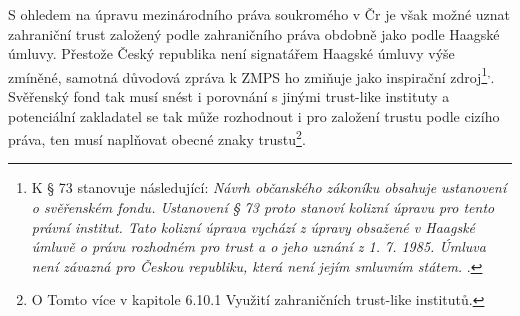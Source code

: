 \documentclass{article}
\begin{document}
S ohledem na úpravu mezinárodního práva soukromého v Čr je však možné uznat zahraniční trust založený podle zahraničního práva obdobně jako podle Haagské úmluvy. Přestože Český republika není signatářem Haagské úmluvy výše zmíněné, samotná důvodová zpráva k ZMPS ho zmiňuje jako inspirační zdroj\footnote{K § 73 stanovuje následující: \textit{Návrh občanského zákoníku obsahuje ustanovení o svěřenském fondu. Ustanovení § 73 proto stanoví kolizní úpravu pro tento právní institut. Tato kolizní úprava vychází z úpravy obsažené v Haagské úmluvě o právu rozhodném pro trust a o jeho uznání z 1. 7. 1985. Úmluva není závazná pro Českou republiku, která není jejím smluvním státem. }.}\textsuperscript{,}. Svěřenský fond tak musí snést i porovnání s jinými trust-like instituty a potenciální zakladatel se tak může rozhodnout i pro založení trustu podle cizího práva, ten musí naplňovat obecné znaky trustu\footnote{O Tomto více v kapitole 6.10.1 Využití zahraničních trust-like institutů.}.\\



\end{document}
